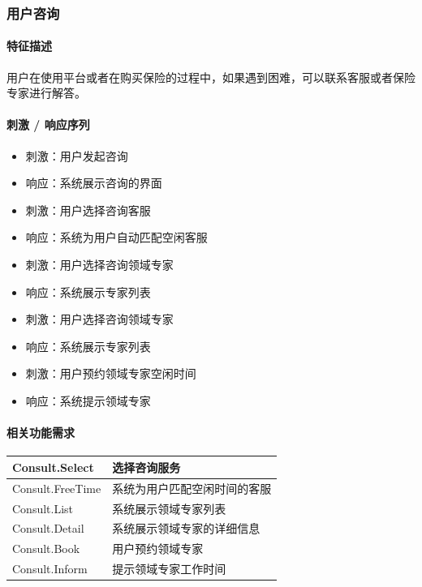 \documentclass[a4paper]{ctexart}
\begin{document}
\subsubsection{用户咨询}

\paragraph{特征描述}

用户在使用平台或者在购买保险的过程中，如果遇到困难，可以联系客服或者保险专家进行解答。

\paragraph{刺激 / 响应序列}

\begin{itemize}
    \item 刺激：用户发起咨询
    \item 响应：系统展示咨询的界面
    \item 刺激：用户选择咨询客服
    \item 响应：系统为用户自动匹配空闲客服
    \item 刺激：用户选择咨询领域专家
    \item 响应：系统展示专家列表
    \item 刺激：用户选择咨询领域专家
    \item 响应：系统展示专家列表
    \item 刺激：用户预约领域专家空闲时间
    \item 响应：系统提示领域专家
\end{itemize}

\paragraph{相关功能需求}

\begin{center}
  \begin{tabular}{p{6cm}|p{8cm}}
    \toprule
    Consult.Select        & 选择咨询服务 \\
    \midrule
    Consult.FreeTime      & 系统为用户匹配空闲时间的客服           \\
    \midrule
    Consult.List & 系统展示领域专家列表           \\
    \midrule
    Consult.Detail & 系统展示领域专家的详细信息           \\
    \midrule
    Consult.Book & 用户预约领域专家          \\
    \midrule
    Consult.Inform & 提示领域专家工作时间          \\
    \bottomrule
  \end{tabular}
\end{center}
\end{document}
